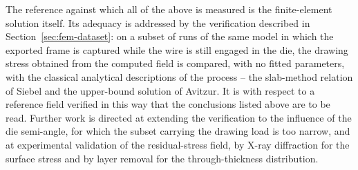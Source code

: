 \documentclass[subscriptcorrection,upint,varvw,barcolor=Goldenrod3,mathalfa=cal=euler,balance,hyphenate,french,pdf-a]{asmejour} %
\begin{document}
The reference against which all of the above is measured is the finite-element solution itself. Its adequacy is addressed by the verification described in Section~\ref{sec:fem-dataset}: on a subset of runs of the same model in which the exported frame is captured while the wire is still engaged in the die, the drawing stress obtained from the computed field is compared, with no fitted parameters, with the classical analytical descriptions of the process -- the slab-method relation of Siebel and the upper-bound solution of Avitzur. It is with respect to a reference field verified in this way that the conclusions listed above are to be read. Further work is directed at extending the verification to the influence of the die semi-angle, for which the subset carrying the drawing load is too narrow, and at experimental validation of the residual-stress field, by X-ray diffraction for the surface stress and by layer removal for the through-thickness distribution.
\end{document}
